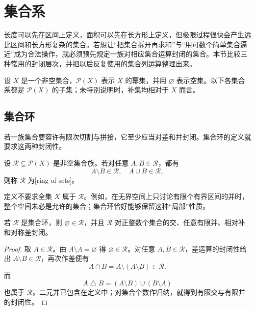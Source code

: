 \section{集合系}
\label{b1:sec:0101}

长度可以先在区间上定义，面积可以先在长方形上定义，但极限过程很快会产生远比区间和长方形复杂的集合。若想让“把集合拆开再求和”与“用可数个简单集合逼近”成为合法操作，就必须预先规定一族对相应集合运算封闭的集合。本节比较三种常用的封闭层次，并把以后反复使用的集合列运算整理出来。

\ProseParagraphBreak

设 \(X\) 是一个非空集合，\(\mathcal P(X)\) 表示 \(X\) 的幂集，并用 \(\varnothing\) 表示空集。以下各集合系都是 \(\mathcal P(X)\) 的子集；未特别说明时，补集均相对于 \(X\) 而言。

\subsection{集合环}
\label{b1:subsec:010101}

若一族集合要容许有限次切割与拼接，它至少应当对差和并封闭。集合环的定义就要求这两种封闭性。

\begin{definition}
\label{b1:def:set-ring}
设 \(\mathcal R\subseteq\mathcal P(X)\) 是非空集合族。若对任意 \(A,B\in\mathcal R\)，都有
\[
A\setminus B\in\mathcal R,
\quad
A\cup B\in\mathcal R,
\]
则称 \(\mathcal R\) 为[ring of sets]。
\end{definition}

定义不要求全集 \(X\) 属于 \(\mathcal R\)。例如，在无界空间上只讨论有限个有界区间的并时，整个空间未必是允许的集合；集合环恰好能够保留这种“局部”性质。

\begin{proposition}
\label{b1:prop:ring-closure}
若 \(\mathcal R\) 是集合环，则 \(\varnothing\in\mathcal R\)，并且 \(\mathcal R\) 对正整数个集合的交、任意有限并、相对补和对称差封闭。
\end{proposition}
\begin{proof}
取 \(A\in\mathcal R\)。由 \(A\setminus A=\varnothing\) 得 \(\varnothing\in\mathcal R\)。对任意 \(A,B\in\mathcal R\)，差运算的封闭性给出 \(A\setminus B\in\mathcal R\)，再次作差便有
\[
A\cap B=A\setminus(A\setminus B)\in\mathcal R.
\]
而
\[
A\mathbin{\triangle}B
=(A\setminus B)\cup(B\setminus A)
\]
也属于 \(\mathcal R\)。二元并已包含在定义中；对集合个数作归纳，就得到有限交与有限并的封闭性。
\end{proof}

